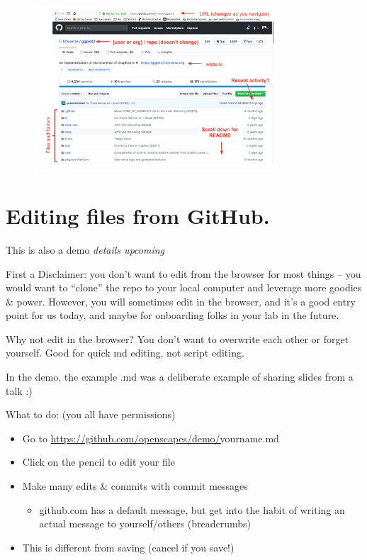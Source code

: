 \documentclass[
  letterpaper,
  DIV=11,
  numbers=noendperiod]{scrreprt}
\providecommand{\tightlist}{%
  \setlength{\itemsep}{0pt}\setlength{\parskip}{0pt}}
\begin{document}
\begin{figure}[H]

{\centering \includegraphics[width=0.8\textwidth,height=\textheight]{./img/github-orientation.png}

}

\end{figure}

\hypertarget{editing-files-from-github.}{%
\section{Editing files from GitHub.}\label{editing-files-from-github.}}

This is also a demo \emph{details upcoming}

First a Disclaimer: you don't want to edit from the browser for most
things -- you would want to ``clone'' the repo to your local computer
and leverage more goodies \& power. However, you will sometimes edit in
the browser, and it's a good entry point for us today, and maybe for
onboarding folks in your lab in the future.

Why not edit in the browser? You don't want to overwrite each other or
forget yourself. Good for quick md editing, not script editing.

In the demo, the example .md was a deliberate example of sharing slides
from a talk :)

What to do: (you all have permissions)

\begin{itemize}
\tightlist
\item
  Go to \url{https://github.com/openscapes/demo/}yourname.md
\item
  Click on the pencil to edit your file
\item
  Make many edits \& commits with commit messages

  \begin{itemize}
  \tightlist
  \item
    github.com has a default message, but get into the habit of writing
    an actual message to yourself/others (breadcrumbs)
  \end{itemize}
\item
  This is different from saving (cancel if you save!)
\end{itemize}
\end{document}

